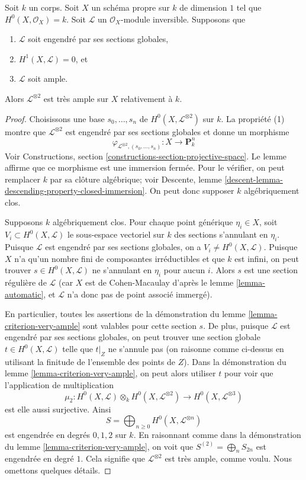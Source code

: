 \begin{lemma}
\label{lemma-criterion-very-ample-bis}
Soit $k$ un corps. Soit $X$ un schéma propre sur $k$ de dimension $1$ tel que $H^0(X, \mathcal{O}_X) = k$. Soit $\mathcal{L}$ un $\mathcal{O}_X$-module inversible. Supposons que \begin{enumerate} \item $\mathcal{L}$ soit engendré par ses sections globales, \item $H^1(X, \mathcal{L}) = 0$, et \item $\mathcal{L}$ soit ample. \end{enumerate} Alors $\mathcal{L}^{\otimes 2}$ est très ample sur $X$ relativement à $k$.
\end{lemma}

\begin{proof}
Choisissons une base $s_0, \ldots, s_n$ de $H^0(X, \mathcal{L}^{\otimes 2})$ sur $k$. La propriété (1) montre que $\mathcal{L}^{\otimes 2}$ est engendré par ses sections globales et donne un morphisme $$
\varphi_{\mathcal{L}^{\otimes 2}, (s_0, \ldots, s_n)} :
X \longrightarrow \mathbf{P}^n_k
$$ Voir Constructions, section \ref{constructions-section-projective-space}. Le lemme affirme que ce morphisme est une immersion fermée. Pour le vérifier, on peut remplacer $k$ par sa clôture algébrique; voir Descente, lemme \ref{descent-lemma-descending-property-closed-immersion}. On peut donc supposer $k$ algébriquement clos.

\medskip\noindent
Supposons $k$ algébriquement clos. Pour chaque point générique $\eta_i \in X$, soit $V_i \subset H^0(X, \mathcal{L})$ le sous-espace vectoriel sur $k$ des sections s'annulant en $\eta_i$. Puisque $\mathcal{L}$ est engendré par ses sections globales, on a $V_i \not = H^0(X, \mathcal{L})$. Puisque $X$ n'a qu'un nombre fini de composantes irréductibles et que $k$ est infini, on peut trouver $s \in H^0(X, \mathcal{L})$ ne s'annulant en $\eta_i$ pour aucun $i$. Alors $s$ est une section régulière de $\mathcal{L}$ (car $X$ est de Cohen-Macaulay d'après le lemme \ref{lemma-automatic}, et $\mathcal{L}$ n'a donc pas de point associé immergé).

\medskip\noindent
En particulier, toutes les assertions de la démonstration du lemme \ref{lemma-criterion-very-ample} sont valables pour cette section $s$. De plus, puisque $\mathcal{L}$ est engendré par ses sections globales, on peut trouver une section globale $t \in H^0(X, \mathcal{L})$ telle que $t|_Z$ ne s'annule pas (on raisonne comme ci-dessus en utilisant la finitude de l'ensemble des points de $Z$). Dans la démonstration du lemme \ref{lemma-criterion-very-ample}, on peut alors utiliser $t$ pour voir que l'application de multiplication $$
\mu_2 :
H^0(X, \mathcal{L}) \otimes_k H^0(X, \mathcal{L}^{\otimes 2})
\longrightarrow
H^0(X, \mathcal{L}^{\otimes 3})
$$ est elle aussi surjective. Ainsi $$
S = \bigoplus\nolimits_{n \geq 0} H^0(X, \mathcal{L}^{\otimes n})
$$ est engendrée en degrés $0, 1, 2$ sur $k$. En raisonnant comme dans la démonstration du lemme \ref{lemma-criterion-very-ample}, on voit que $S^{(2)} = \bigoplus_{n} S_{2n}$ est engendrée en degré $1$. Cela signifie que $\mathcal{L}^{\otimes 2}$ est très ample, comme voulu. Nous omettons quelques détails.
\end{proof}
